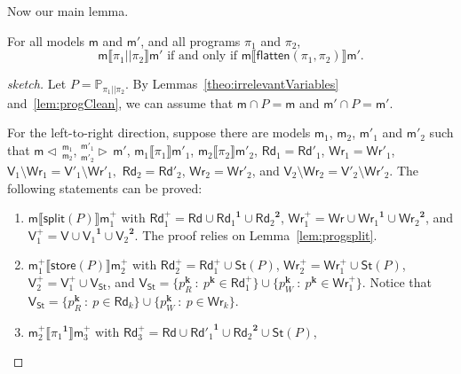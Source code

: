 \documentclass{llncs}
\newcommand{\progStore}{\mathsf{store}}
\newcommand{\progsplit}{\mathsf{split}}
\newcommand{\progFlatten}{\mathsf{flatten}}
\newcommand{\cp}[2]{{#2}^\mathbf{#1}}
\newcommand{\cpr}[2]{\cp{#1}{#2}_R}
\newcommand{\cpw}[2]{\cp{#1}{#2}_W}
\newcommand{\modl}{\mathsf m}
\newcommand{\mrg}[3]{ ^{#2}_{#3} \triangleright \, #1 }
\newcommand{\pll}{ {||} }							%
\newcommand{\splt}[3]{ #1 \triangleleft \, ^{#2}_{#3} }
\newcommand{\readset}{\mathsf{Rd}}
\newcommand{\valuset}{\mathsf{V}}
\newcommand{\writeset}{\mathsf{Wr}}
\newcommand{\storeset}{\mathsf{St}}
\newcommand{\intPgm}[1]{\llbracket #1 \rrbracket}
\newcommand{\propset}{\mathbb P}
\newcommand{\propsetOf}[1]{\propset_{#1}}
\newcommand{\modinter}{\cap}
\newcommand{\set}[1]{\{#1\}}
\newcommand{\suchthat}{~ : ~}
\begin{document}
Now our main lemma.

\begin{lemma}\label{lem:pllequivalence}
For all models $\modl$ and $\modl'$, and all programs $\pi_1$ and $\pi_2$,
$$
\modl \intPgm{\pi_1 \pll \pi_2} \modl' \text{ if and only if }
\modl \intPgm{\progFlatten(\pi_1, \pi_2)} \modl' \text{.}
$$
\end{lemma}
\begin{proof}[sketch]
Let $P = \propsetOf{\pi_1 \pll \pi_2}$. By Lemmas~\ref{theo:irrelevantVariables} and~\ref{lem:progClean},
we can assume that $\modl \modinter P = \modl$ and $\modl' \modinter P = \modl'$.

For the left-to-right direction, suppose there are models $\modl_1$, $\modl_2$, $\modl'_1$ and $\modl'_2$ such that
$\splt{\modl}{\modl_1} {\modl_2} $, $\mrg{\modl'}{\modl'_1} {\modl'_2} $,
$\modl_1 \intPgm{ \pi_1 } \modl'_1$, 
$\modl_2 \intPgm{ \pi_2 } \modl'_2$, 
$\readset_1 = \readset'_1 $, $\writeset_1 = \writeset'_1 $, $\valuset_1 \setminus \writeset_1 = \valuset'_1 \setminus \writeset'_1 , $
$\readset_2 = \readset'_2 $, $\writeset_2 = \writeset'_2 $, and $\valuset_2 \setminus \writeset_2 = \valuset'_2 \setminus \writeset'_2 $.
The following statements can be proved:
\begin{enumerate}
  \item\label{pllequivalence:ltr:split}
        $\modl \intPgm{\progsplit(P)} \modl^+_1$ with
        $\readset^+_1 = \readset \cup \cp 1 {\readset_1} \cup \cp 2 {\readset_2}$,
        $\writeset^+_1 = \writeset \cup \cp 1 {\writeset_1} \cup \cp 2 {\writeset_2}$, and
        $\valuset^+_1 = \valuset \cup \cp 1 {\valuset_1} \cup \cp 2 {\valuset_2}$.
        The proof relies on Lemma~\ref{lem:progsplit}.
  \item\label{pllequivalence:ltr:store}
        $\modl^+_1 \intPgm{\progStore(P)} \modl^+_2$ with
        $\readset^+_2 = \readset^+_1 \cup \storeset(P)$,
        $\writeset^+_2 = \writeset^+_1 \cup \storeset(P)$,
        $\valuset^+_2 = \valuset^+_1 \cup \valuset_{\storeset}$, and
        $\valuset_{\storeset} =
        \set{ \cpr k p \suchthat \cp k p \in \readset^+_1} \cup
        \set{ \cpw k p \suchthat \cp k p \in \writeset^+_1}$.
        Notice that
        $\valuset_{\storeset} =
        \set{ \cpr k p \suchthat p \in \readset_k} \cup
        \set{ \cpw k p \suchthat p \in \writeset_k}$.
  \item\label{pllequivalence:ltr:pi1}
        $\modl^+_2 \intPgm{\cp 1 {\pi_1}} \modl^+_3$ with
        $\readset^+_3 = \readset \cup \cp 1 {\readset'_1} \cup \cp 2 {\readset_2} \cup \storeset(P)$,

\end{enumerate}
\end{proof}
\end{document}
